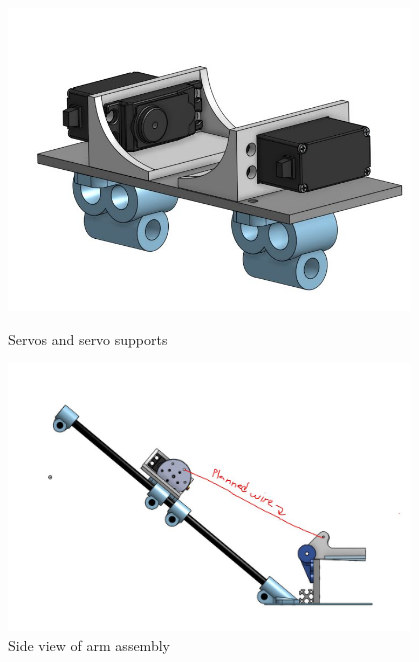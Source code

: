 \begin{figure}[ht]
\centering
\begin{minipage}[b]{.48\textwidth}
  \centering
  \includegraphics[width=0.95\textwidth]{Meetings/October/10-30-21/10-30-21_CAD_Figure6 - Nathan Forrer.JPG}
  \caption{Servos and servo supports}
  \label{fig:pic5}
\end{minipage}%
\hfill%
\begin{minipage}[b]{.48\textwidth}
  \centering
  \includegraphics[width=0.95\textwidth]{Meetings/October/10-30-21/10-30-21_CAD_Figure7 - Nathan Forrer.JPG}
  \caption{Side view of arm assembly}
  \label{fig:pic6}
\end{minipage}
\end{figure}

